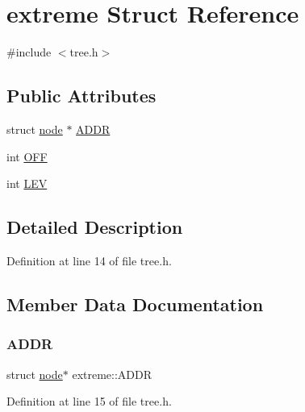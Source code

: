 \hypertarget{structextreme}{}\section{extreme Struct Reference}
\label{structextreme}


{\ttfamily \#include $<$tree.\+h$>$}

\subsection*{Public Attributes}
\begin{DoxyCompactItemize}
\item 
struct \mbox{\hyperlink{structnode}{node}} $\ast$ \mbox{\hyperlink{structextreme_ad812cff0639a5729d915cbf31cab81a3}{A\+D\+DR}}
\item 
int \mbox{\hyperlink{structextreme_a2594b8d2d70bf2297ff656589114fb44}{O\+FF}}
\item 
int \mbox{\hyperlink{structextreme_ab8066746cb5e3b173f2b8dce516ed6f9}{L\+EV}}
\end{DoxyCompactItemize}


\subsection{Detailed Description}


Definition at line 14 of file tree.\+h.



\subsection{Member Data Documentation}
\mbox{\label{structextreme_ad812cff0639a5729d915cbf31cab81a3}} 
\subsubsection{\texorpdfstring{A\+D\+DR}{ADDR}}
{\footnotesize\ttfamily struct \mbox{\hyperlink{structnode}{node}}$\ast$ extreme\+::\+A\+D\+DR}



Definition at line 15 of file tree.\+h.

\mbox{\label{structextreme_ab8066746cb5e3b173f2b8dce516ed6f9}} 
